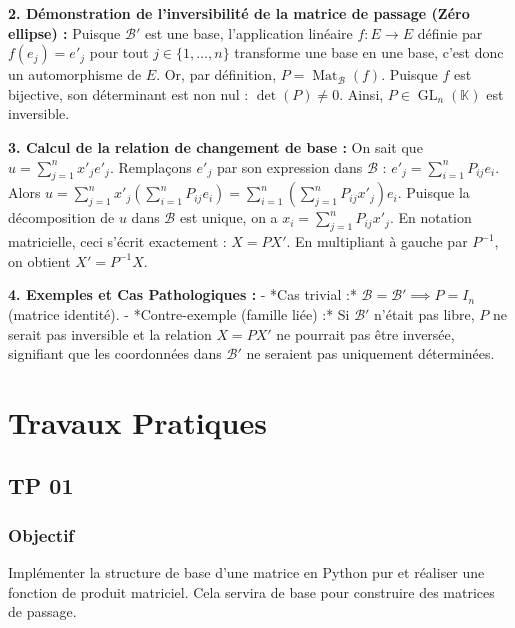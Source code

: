 \documentclass{report}
\begin{document}
\textbf{2. Démonstration de l'inversibilité de la matrice de passage (Zéro ellipse) :}
Puisque $\mathcal{B}'$ est une base, l'application linéaire $f : E \to E$ définie par $f(e_j) = e'_j$ pour tout $j \in \{1, \dots, n\}$ transforme une base en une base, c'est donc un automorphisme de $E$.
Or, par définition, $P = \operatorname{Mat}_{\mathcal{B}}(f)$.
Puisque $f$ est bijective, son déterminant est non nul : $\det(P) \neq 0$.
Ainsi, $P \in \operatorname{GL}_n(\mathbb{K})$ est inversible.

\textbf{3. Calcul de la relation de changement de base :}
On sait que $u = \sum_{j=1}^n x'_j e'_j$.
Remplaçons $e'_j$ par son expression dans $\mathcal{B}$ : $e'_j = \sum_{i=1}^n P_{ij} e_i$.
Alors $u = \sum_{j=1}^n x'_j \left( \sum_{i=1}^n P_{ij} e_i \right) = \sum_{i=1}^n \left( \sum_{j=1}^n P_{ij} x'_j \right) e_i$.
Puisque la décomposition de $u$ dans $\mathcal{B}$ est unique, on a $x_i = \sum_{j=1}^n P_{ij} x'_j$.
En notation matricielle, ceci s'écrit exactement : $X = P X'$.
En multipliant à gauche par $P^{-1}$, on obtient $X' = P^{-1} X$.

\textbf{4. Exemples et Cas Pathologiques :}
- *Cas trivial :* $\mathcal{B} = \mathcal{B}' \implies P = I_n$ (matrice identité).
- *Contre-exemple (famille liée) :* Si $\mathcal{B}'$ n'était pas libre, $P$ ne serait pas inversible et la relation $X = P X'$ ne pourrait pas être inversée, signifiant que les coordonnées dans $\mathcal{B}'$ ne seraient pas uniquement déterminées.


\chapter{Travaux Pratiques}
\section*{TP 01}
\subsection*{Objectif}
Implémenter la structure de base d'une matrice en Python pur et réaliser une fonction de produit matriciel. Cela servira de base pour construire des matrices de passage.
\end{document}
